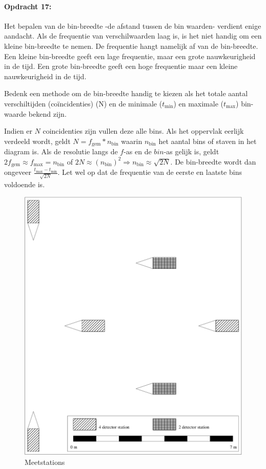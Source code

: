 \bigskip{}
\begin{minipage}[t]{1\columnwidth}%

\paragraph{Opdracht 17:}

Het bepalen van de bin-breedte -de afstand tussen de bin waarden-
verdient enige aandacht. Als de frequentie van verschilwaarden laag
is, is het niet handig om een kleine bin-breedte te nemen. De frequentie
hangt namelijk af van de bin-breedte. Een kleine bin-breedte geeft
een lage frequentie, maar een grote nauwkeurigheid in de tijd. Een
grote bin-breedte geeft een hoge frequentie maar een kleine nauwkeurigheid
in de tijd.

Bedenk een methode om de bin-breedte handig te kiezen als
het totale aantal verschiltijden (coïncidenties) (N) en de minimale
($t_\textrm{min}$) en maximale ($t_\textrm{max}$) bin-waarde bekend zijn.

Indien er $N$ coincidenties zijn vullen deze alle bins. Als het oppervlak
eerlijk verdeeld wordt, geldt $N=f_\textrm{gem}*n_\textrm{bin}$ waarin $n_\textrm{bin}$
het aantal bins of staven in het diagram is. Als de resolutie langs
de $f$-as en de $bin$-as gelijk is, geldt $2f_\textrm{gem}\approx f_\textrm{max}=n_\textrm{bin}$
of $2N\approx\left(n_\textrm{bin}\right)^{2}\Rightarrow n_\textrm{bin}\approx\sqrt{2N}$.
De bin-breedte wordt dan ongeveer $\frac{t_\textrm{max}-t_\textrm{min}}{\sqrt{2N}}$.
Let wel op dat de frequentie van de eerste en laatste bins voldoende
is. %
\end{minipage}

\bigskip{}

\begin{figure}[p]
    \centering
    \includegraphics[width=15.833cm]{Figures/station}
    \caption{\label{fig:Meetstations}Meetstations}
\end{figure}


